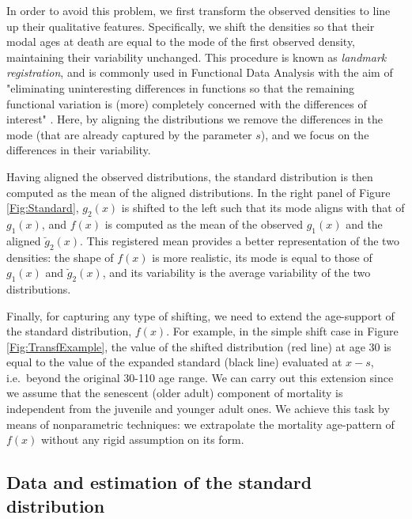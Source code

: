 \documentclass[Thesis]{subfiles}
\begin{document}
In order to avoid this problem, we first transform the observed densities to line up their qualitative features. Specifically, we shift the densities so that their modal ages at death are equal to the mode of the first observed density, maintaining their variability unchanged. This procedure is known as \emph{landmark registration}, and is commonly used in Functional Data Analysis \citep{ramsay2005FDA} with the aim of "eliminating uninteresting differences in functions so that the remaining functional variation is (more) completely concerned with the differences of interest" \citep[p.~88]{clarkson2005fdamanual}. Here, by aligning the distributions we remove the differences in the mode (that are already captured by the parameter $s$), and we focus on the differences in their variability. 

Having aligned the observed distributions, the standard distribution is then computed as the mean of the aligned distributions. In the right panel of Figure \ref{Fig:Standard}, $g_{2}(x)$ is shifted to the left such that its mode aligns with that of $g_{1}(x)$, and $f(x)$ is computed as the mean of the observed $g_{1}(x)$ and the aligned $\breve{g}_{2}(x)$. This registered mean provides a better representation of the two densities: the shape of $f(x)$ is more realistic, its mode is equal to those of $g_1(x)$ and $\breve{g}_{2}(x)$, and its variability is the average variability of the two distributions.  

Finally, for capturing any type of shifting, we need to extend the age-support of the standard distribution, $f(x)$. For example, in the simple shift case in Figure \ref{Fig:TransfExample}, the value of the shifted distribution (red line) at age 30 is equal to the value of the expanded standard (black line) evaluated at $x-s$, i.e.~beyond the original 30-110 age range. We can carry out this extension since we assume that the senescent (older adult) component of mortality is independent from the juvenile and younger adult ones. We achieve this task by means of nonparametric techniques: we extrapolate the mortality age-pattern of $f(x)$ without any rigid assumption on its form. 

\subsection{Data and estimation of the standard distribution}\label{Subsec:Ch3subsec2.3}
\end{document}
